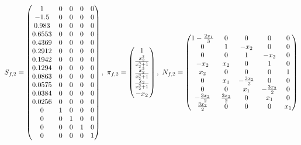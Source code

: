 \documentclass[fleqn]{article}
\begin{document}
\bigskip

$
S_{f,2} = \pmqty{ 1 & 0 & 0 & 0 & 0 \\ -1.5 & 0 & 0 & 0 & 0 \\ 0.983 & 0 & 0 & 0 & 0 \\ 0.6553 & 0 & 0 & 0 & 0 \\ 0.4369 & 0 & 0 & 0 & 0 \\ 0.2912 & 0 & 0 & 0 & 0 \\ 0.1942 & 0 & 0 & 0 & 0 \\ 0.1294 & 0 & 0 & 0 & 0 \\ 0.0863 & 0 & 0 & 0 & 0 \\ 0.0575 & 0 & 0 & 0 & 0 \\ 0.0384 & 0 & 0 & 0 & 0 \\ 0.0256 & 0 & 0 & 0 & 0 \\ 0 & 1 & 0 & 0 & 0 \\ 0 & 0 & 1 & 0 & 0 \\ 0 & 0 & 0 & 1 & 0 \\ 0 & 0 & 0 & 0 & 1 },~
\pi_{f,2} = \pmqty{
    1                         \\
    \frac{x_{2}^3}{x_{2}^3+1} \\
    \frac{x_{2}^2}{x_{2}^3+1} \\
    \frac{x_{2}}{x_{2}^3+1}   \\
    -x_{2}                    \\
},~
N_{f,2} = \pmqty{
    1-\frac{2x_{1}}{3} & 0                & 0                 & 0                 & 0     \\
    0                  & 1                & -x_{2}            & 0                 & 0     \\
    0                  & 0                & 1                 & -x_{2}            & 0     \\
    -x_{2}             & x_{2}            & 0                 & 1                 & 0     \\
    x_{2}              & 0                & 0                 & 0                 & 1     \\
    0                  & x_{1}            & -\frac{3x_{2}}{2} & 0                 & 0     \\
    0                  & 0                & x_{1}             & -\frac{3x_{2}}{2} & 0     \\
    -\frac{3x_{2}}{2}  & \frac{3x_{2}}{2} & 0                 & x_{1}             & 0     \\
    \frac{3x_{2}}{2}   & 0                & 0                 & 0                 & x_{1} \\
}$
\end{document}
